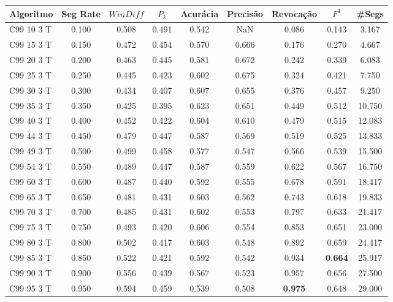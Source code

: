 \documentclass{article}
\begin{document}
 

\begin{longtable}[c]{|l|c|c|c|c|c|c|c|c|} 
\hline 
Algoritmo & Seg Rate & $WinDiff$ & $P_k$ & Acurácia & Precisão & Revocação & $F^1$ & \#Segs\\ \hline 
C99 10  3 T & 0.100 & 0.508 & 0.491 & 0.542 & NaN & 0.086 & 0.143 & 3.167  \\ \hline 
 C99 15  3 T & 0.150 & 0.472 & 0.454 & 0.570 & 0.666 & 0.176 & 0.270 & 4.667  \\ \hline 
 C99 20  3 T & 0.200 & 0.463 & 0.445 & 0.581 & 0.672 & 0.242 & 0.339 & 6.083  \\ \hline 
 C99 25  3 T & 0.250 & 0.445 & 0.423 & 0.602 & 0.675 & 0.324 & 0.421 & 7.750  \\ \hline 
 C99 30  3 T & 0.300 & 0.434 & 0.407 & 0.607 & 0.655 & 0.376 & 0.457 & 9.250  \\ \hline 
 C99 35  3 T & 0.350 & 0.425 & 0.395 & 0.623 & 0.651 & 0.449 & 0.512 & 10.750  \\ \hline 
 C99 40  3 T & 0.400 & 0.452 & 0.422 & 0.604 & 0.610 & 0.479 & 0.515 & 12.083  \\ \hline 
 C99 44  3 T & 0.450 & 0.479 & 0.447 & 0.587 & 0.569 & 0.519 & 0.525 & 13.833  \\ \hline 
 C99 49  3 T & 0.500 & 0.499 & 0.458 & 0.577 & 0.547 & 0.566 & 0.539 & 15.500  \\ \hline 
 C99 54  3 T & 0.550 & 0.489 & 0.447 & 0.587 & 0.559 & 0.622 & 0.567 & 16.750  \\ \hline 
 C99 60  3 T & 0.600 & 0.487 & 0.440 & 0.592 & 0.555 & 0.678 & 0.591 & 18.417  \\ \hline 
 C99 65  3 T & 0.650 & 0.481 & 0.431 & 0.603 & 0.562 & 0.743 & 0.618 & 19.833  \\ \hline 
 C99 70  3 T & 0.700 & 0.485 & 0.431 & 0.602 & 0.553 & 0.797 & 0.633 & 21.417  \\ \hline 
 C99 75  3 T & 0.750 & 0.493 & 0.420 & 0.606 & 0.554 & 0.853 & 0.651 & 23.000  \\ \hline 
 C99 80  3 T & 0.800 & 0.502 & 0.417 & 0.603 & 0.548 & 0.892 & 0.659 & 24.417  \\ \hline 
 C99 85  3 T & 0.850 & 0.522 & 0.421 & 0.592 & 0.542 & 0.934 & \cellcolor{gray!20} \textbf{0.664} & 25.917  \\ \hline 
 C99 90  3 T & 0.900 & 0.556 & 0.439 & 0.567 & 0.523 & 0.957 & 0.656 & 27.500  \\ \hline 
 C99 95  3 T & 0.950 & 0.594 & 0.459 & 0.539 & 0.508 & \cellcolor{gray!20} \textbf{0.975} & 0.648 & 29.000  \\ \hline 

\end{longtable}
\end{document}
